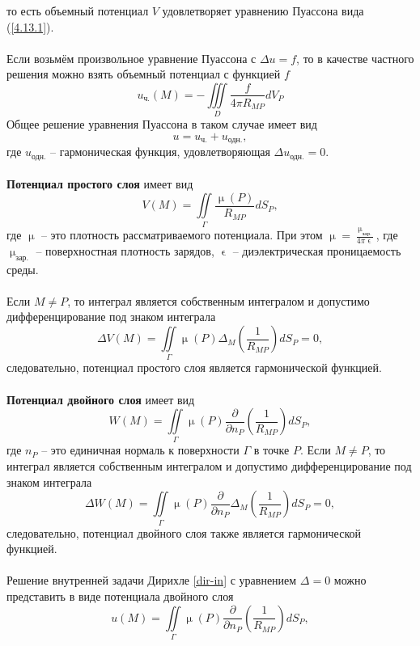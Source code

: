 \documentclass[a4paper, 12pt]{report}
\numberwithin{equation}{section}
\renewcommand{\mu}{\upmu}
\renewcommand{\varepsilon}{\upvarepsilon}
\newcommand{\pderiv}[2]{\dfrac{\partial #1}{\partial #2}}
\begin{document}
	то есть объемный потенциал $V$ удовлетворяет уравнению Пуассона вида (\ref{4.13.1}).\\\\
	Если возьмём произвольное уравнение Пуассона с $\Delta u=f$, то в качестве частного решения можно взять объемный потенциал с функцией $f$
	\begin{equation}
		u_{\text{ч.}}(M)=-\iiint\limits_D\frac{f}{4\pi R_{MP}}dV_P
	\end{equation} 
	Общее решение уравнения Пуассона в таком случае имеет вид
	\begin{equation}
		u=u_{\text{ч.}}+u_{\text{одн.}},
	\end{equation}
	где $u_{\text{одн.}}$ -- гармоническая функция, удовлетворяющая $\Delta u_{\text{одн.}}=0$.
	\\\\
	\textbf{Потенциал простого слоя} имеет вид
	\begin{equation}
		V(M)=\iint\limits_\Gamma\frac{\mu(P)}{R_{MP}}dS_P,
	\end{equation}
	где $\mu$ -- это плотность рассматриваемого потенциала.
	При этом $\mu=\frac{\mu_{\text{зар.}}}{4\pi\varepsilon}$, где $\mu_{\text{зар.}}$ -- поверхностная плотность зарядов, $\varepsilon$ -- диэлектрическая проницаемость среды.\\\\
	Если $M\neq P$, то интеграл является собственным интегралом и допустимо дифференцирование под знаком интеграла
	$$\Delta V(M)=\iint\limits_\Gamma \mu(P)\Delta_M\left(\frac{1}{R_{MP}}\right)dS_P=0,$$
	следовательно, потенциал простого слоя является гармонической функцией.\\\\
	\textbf{Потенциал двойного слоя} имеет вид
	\begin{equation}
		W(M)=\iint\limits_\Gamma\mu(P)\pderiv{}{n_P}\left(\frac{1}{R_{MP}}\right)dS_P,
	\end{equation}
	где $n_P$ -- это единичная нормаль к поверхности $\Gamma$ в точке $P$.
	Если $M\neq P$, то интеграл является собственным интегралом и допустимо дифференцирование под знаком интеграла
	$$\Delta W(M)=\iint\limits_\Gamma \mu(P)\pderiv{}{n_P}\Delta_M\left(\frac{1}{R_{MP}}\right)dS_P=0,$$
	следовательно, потенциал двойного слоя также является гармонической функцией.\\\\
	Решение внутренней задачи Дирихле \eqref{dir-in} с уравнением $\Delta = 0$ можно представить в виде потенциала двойного слоя
	\begin{equation}\label{4.15.3}
		u(M)=\iint\limits_\Gamma \mu(P)\pderiv{}{n_P}\left(\frac{1}{R_{MP}}\right)dS_P,
	\end{equation}
\end{document}
